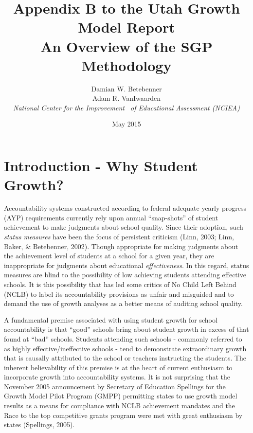 \documentclass[12pt]{article}
\begin{document}
\title{\textsf{\LARGE Appendix B to the Utah Growth Model Report  \\\medskip An Overview of the SGP Methodology }}
\author{  Damian W. Betebenner    \\   Adam R. VanIwaarden    \\   \emph{National Center for the Improvement \ of Educational Assessment (NCIEA)}   }

 \date{May 2015} 

\maketitle

\newpage


\section{Introduction - Why Student
Growth?}\label{introduction---why-student-growth}

Accountability systems constructed according to federal adequate yearly
progress (AYP) requirements currently rely upon annual ``snap-shots'' of
student achievement to make judgments about school quality. Since their
adoption, such \emph{status measures} have been the focus of persistent
criticism (Linn, 2003; Linn, Baker, \& Betebenner, 2002). Though
appropriate for making judgments about the achievement level of students
at a school for a given year, they are inappropriate for judgments about
educational \emph{effectiveness}. In this regard, status measures are
blind to the possibility of low achieving students attending effective
schools. It is this possibility that has led some critics of No Child
Left Behind (NCLB) to label its accountability provisions as unfair and
misguided and to demand the use of growth analyses as a better means of
auditing school quality.

A fundamental premise associated with using student growth for school
accountability is that ``good'' schools bring about student growth in
excess of that found at ``bad'' schools. Students attending such schools
- commonly referred to as highly effective/ineffective schools - tend to
demonstrate extraordinary growth that is causally attributed to the
school or teachers instructing the students. The inherent believability
of this premise is at the heart of current enthusiasm to incorporate
growth into accountability systems. It is not surprising that the
November 2005 announcement by Secretary of Education Spellings for the
Growth Model Pilot Program (GMPP) permitting states to use growth model
results as a means for compliance with NCLB achievement mandates and the
Race to the top competitive grants program were met with great
enthusiasm by states (Spellings, 2005).
\end{document}

